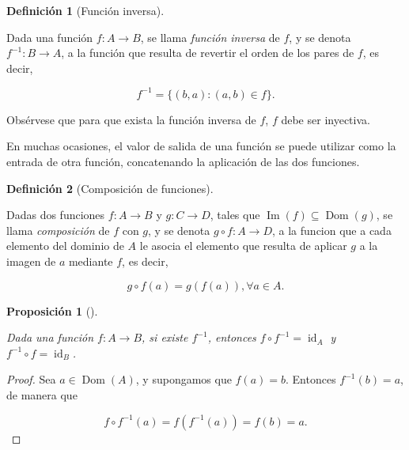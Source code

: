 \documentclass[
  a4paper,
]{scrreport}
\theoremstyle{definition}
\newtheorem{definition}{Definición}[chapter]
\theoremstyle{plain}
\theoremstyle{plain}
\newtheorem{proposition}{Proposición}[chapter]
\theoremstyle{definition}
\theoremstyle{definition}
\theoremstyle{plain}
\theoremstyle{remark}
\begin{document}
\begin{definition}[Función
inversa]\protect\hypertarget{def-funcion-inversa}{}\label{def-funcion-inversa}

Dada una función \(f:A\rightarrow B\), se llama \emph{función inversa}
de \(f\), y se denota \(f^{-1}:B\rightarrow A\), a la función que
resulta de revertir el orden de los pares de \(f\), es decir,

\[f^{-1} = \{ (b,a) : (a,b) \in f \}.\]

\end{definition}

Obsérvese que para que exista la función inversa de \(f\), \(f\) debe
ser inyectiva.

En muchas ocasiones, el valor de salida de una función se puede utilizar
como la entrada de otra función, concatenando la aplicación de las dos
funciones.

\begin{definition}[Composición de
funciones]\protect\hypertarget{def-composicion-funciones}{}\label{def-composicion-funciones}

Dadas dos funciones \(f:A\rightarrow B\) y \(g:C\rightarrow D\), tales
que \(\operatorname{Im}(f)\subseteq \operatorname{Dom}(g)\), se llama
\emph{composición} de \(f\) con \(g\), y se denota
\(g\circ f:A\rightarrow D\), a la funcion que a cada elemento del
dominio de \(A\) le asocia el elemento que resulta de aplicar \(g\) a la
imagen de \(a\) mediante \(f\), es decir,

\[g\circ f(a) = g(f(a)), \forall a\in A.\]

\end{definition}

\begin{proposition}[]\protect\hypertarget{prp-composicion-inversa}{}\label{prp-composicion-inversa}

Dada una función \(f:A\rightarrow B\), si existe \(f^{-1}\), entonces
\(f\circ f^{-1} = \operatorname{id}_A\) y
\(f^{-1}\circ f = \operatorname{id}_B\).

\end{proposition}

\begin{tcolorbox}[enhanced jigsaw, breakable, title=\textcolor{quarto-callout-note-color}{\faInfo}\hspace{0.5em}{Demostración}, toprule=.15mm, coltitle=black, arc=.35mm, rightrule=.15mm, colframe=quarto-callout-note-color-frame, colbacktitle=quarto-callout-note-color!10!white, toptitle=1mm, titlerule=0mm, leftrule=.75mm, opacityback=0, colback=white, bottomrule=.15mm, bottomtitle=1mm, left=2mm, opacitybacktitle=0.6]

\begin{proof}

Sea \(a\in\operatorname{Dom}(A)\), y supongamos que \(f(a)=b\). Entonces
\(f^{-1}(b)=a\), de manera que

\[
f\circ f^{-1}(a) 
= f(f^{-1}(a)) 
= f(b)
= a.
\]

\end{proof}

\end{tcolorbox}
\end{document}
